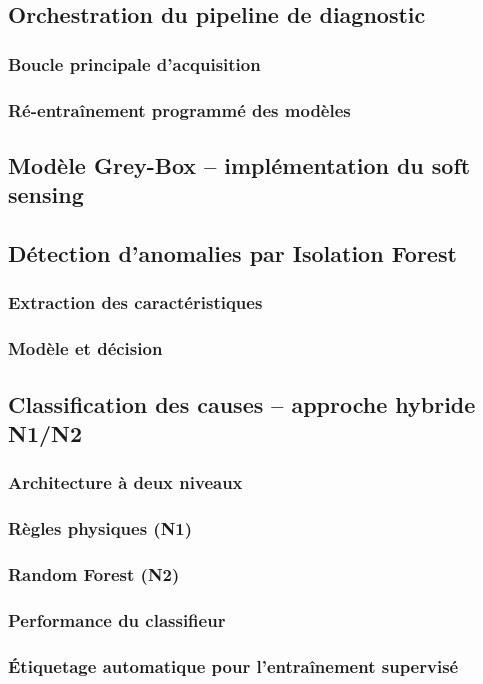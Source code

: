 \documentclass[12pt,a4paper]{report}
\begin{document}
\subsection{Orchestration du pipeline de diagnostic}
\subsubsection{Boucle principale d'acquisition}
\subsubsection{Ré-entraînement programmé des modèles}
\subsection{Modèle Grey-Box -- implémentation du soft sensing}
\subsection{Détection d'anomalies par Isolation Forest}
\subsubsection{Extraction des caractéristiques}
\subsubsection{Modèle et décision}
\subsection{Classification des causes -- approche hybride N1/N2}
\subsubsection{Architecture à deux niveaux}
\subsubsection{Règles physiques (N1)}
\subsubsection{Random Forest (N2)}
\subsubsection{Performance du classifieur}
\subsubsection{Étiquetage automatique pour l'entraînement supervisé}
\end{document}
